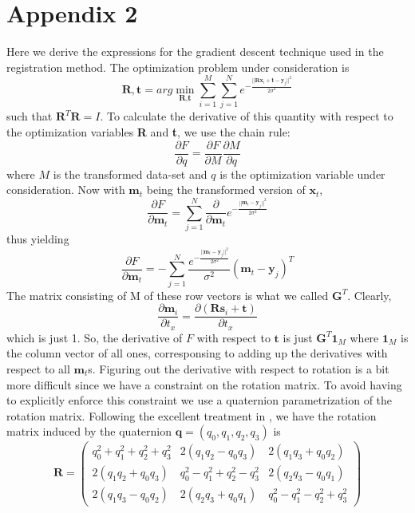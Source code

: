 \documentclass[11pt, a4paper]{article}
\begin{document}
\section*{Appendix 2}
Here we derive the expressions for the gradient descent technique used in the registration method.
\newline \linebreak
\noindent The optimization problem under consideration is $$\textbf{R}, \textbf{t} = arg\min_{\textbf{R}, \textbf{t}} \sum_{i=1}^M \sum_{j=1}^N e^{-\frac{|| \textbf{Rx}_i + \textbf{t} - \textbf{y}_j ||^2}{2 \sigma^2}}$$ such that $\textbf{R}^T \textbf{R} = I$. To calculate the derivative of this quantity with respect to the optimization variables \textbf{R} and \textbf{t}, we use the chain rule:
$$\frac{\partial F}{\partial q} = \frac{\partial F}{\partial M} \frac{\partial M}{\partial q}$$ where $M$ is the transformed data-set and $q$ is the optimization variable under consideration. Now with $\textbf{m}_t$ being the transformed version of $\textbf{x}_t$, $$\frac{\partial F}{\partial \textbf{m}_t} = \sum_{j=1}^N \frac{\partial}{\partial \textbf{m}_t} e^{-\frac{|| \textbf{m}_t - \textbf{y}_j ||^2}{2 \sigma^2}}$$ thus yielding $$\frac{\partial F}{\partial \textbf{m}_t} = -\sum_{j=1}^N \frac{e^{-\frac{|| \textbf{m}_t - \textbf{y}_j ||^2}{2 \sigma^2}}}{\sigma^2} \left( \textbf{m}_t-\textbf{y}_j \right)^T$$ The matrix consisting of M of these row vectors is what we called $\textbf{G}^T$.
\newline \linebreak
\noindent Clearly, $$\frac{\partial \textbf{m}_i}{\partial t_x} = \frac{\partial \left(\textbf{Rs}_i + \textbf{t}\right)}{\partial t_x}$$ which is just 1. So, the derivative of $F$ with respect to $\textbf{t}$ is just $\textbf{G}^T \textbf{1}_M$ where $\textbf{1}_M$ is the column vector of all ones, corresponsing to adding up the derivatives with respect to all $\textbf{m}_t$s.
\newline \linebreak
\noindent Figuring out the derivative with respect to rotation is a bit more difficult since we have a constraint on the rotation matrix. To avoid having to explicitly enforce this constraint we use a quaternion parametrization of the rotation matrix. Following the excellent treatment in \cite{quatParam}, we have the rotation matrix induced by the quaternion $\textbf{q} = (q_0, q_1, q_2, q_3)$ is
$$\textbf{R} = \begin{pmatrix}
q_0^2 + q_1^2 + q_2^2 + q_3^2 & 2(q_1 q_2-q_0 q_3) & 2(q_1 q_3 + q_0 q_2) \\
2(q_1 q_2 + q_0 q_3) & q_0^2 - q_1^2 + q_2^2 - q_3^2 & 2(q_2 q_3 - q_0 q_1) \\
2(q_1 q_3 - q_0 q_2) & 2(q_2 q_3 + q_0 q_1) & q_0^2 - q_1^2 - q_2^2 + q_3^2
\end{pmatrix}$$
\end{document}
